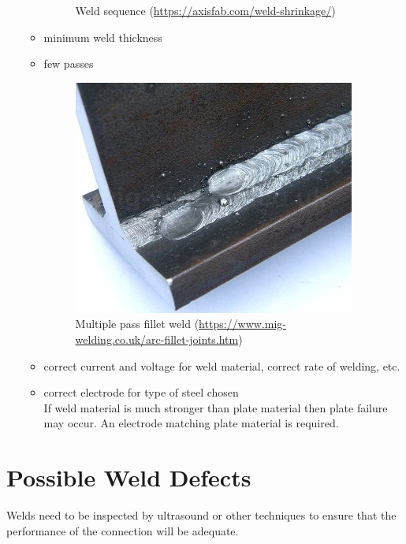 \begin{itemize}
\begin{itemize}
\begin{figure}[H]
\caption{Weld sequence (\href{https://axisfab.com/weld-shrinkage/}{\url{https://axisfab.com/weld-shrinkage/}})}
\end{figure}
\item minimum weld thickness
\item few passes
\begin{figure}[H]
\centering
\includegraphics[scale=.8]{PIC/CH07/MPFW}
\caption{Multiple pass fillet weld (\href{https://www.mig-welding.co.uk/arc-fillet-joints.htm}{\url{https://www.mig-welding.co.uk/arc-fillet-joints.htm}})}
\end{figure}
\item correct current and voltage for weld material, correct rate of welding, etc.
\item correct electrode for type of steel chosen\\If weld material is much stronger than plate material then plate failure may occur. An electrode matching plate material is required.
\end{itemize}
\end{itemize}
\section{Possible Weld Defects}
Welds need to be inspected by ultrasound or other techniques to ensure that the performance of the connection will be adequate.

